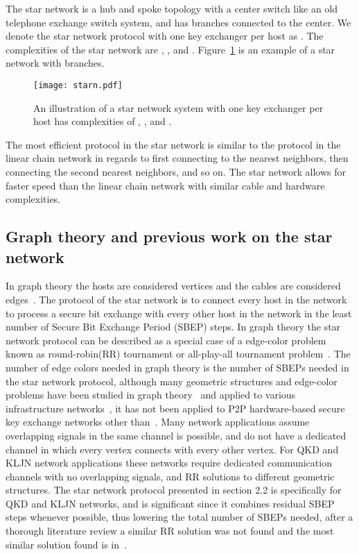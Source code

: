 \documentclass[a4paper,12pt,pdftex]{article}
\begin{document}
The star network is a hub and spoke topology with a center switch like an old telephone exchange switch system, and has branches connected to the center. We denote the star network protocol with one key exchanger per host as . The complexities of the star network are , , and . Figure~\ref{fig:starn} is an example of a star network with  branches.

\begin{figure}[h]
    \caption{An illustration of a star network system with one key exchanger per host has complexities of , , and . }
    \label{fig:starn}
  \centering
\texttt{[image: starn.pdf]}
\end{figure}

The most efficient protocol in the star network is similar to the protocol in the linear chain network in regards to first connecting to the nearest neighbors, then connecting the second nearest neighbors, and so on. The star network allows for faster speed than the linear chain network with similar cable and hardware complexities.

\subsection{Graph theory and previous work on the star network}

In graph theory the hosts are considered vertices and the cables are considered edges~\cite{introgt}. The protocol of the star network is to connect every host in the network to process a secure bit exchange with every other host in the network in the least number of Secure Bit Exchange Period (SBEP) steps. In graph theory the star network protocol can be described as a special case of a edge-color problem~\cite{edgecolor} known as round-robin(RR) tournament or all-play-all tournament problem~\cite{rrp}. The number  of edge colors needed in graph theory is the number of SBEPs needed in the star network protocol, although many geometric structures and edge-color problems have been studied in graph theory~\cite{tutte1, tutte2, best, best2, book1, book2, book3} and applied to various infrastructure networks~\cite{apply1, apply2, apply3, book4}, it has not been applied to P2P hardware-based secure key exchange networks other than~\cite{me1}. Many network applications assume overlapping signals in the same channel is possible, and do not have a dedicated channel in which every vertex connects with every other vertex. For QKD and KLJN network applications these networks require dedicated communication channels with no overlapping signals, and RR solutions to different geometric structures. The star network protocol presented in section 2.2 is specifically for QKD and KLJN networks, and is significant since it combines residual SBEP steps whenever possible, thus lowering the total number of SBEPs needed, after a thorough literature review a similar RR solution was not found and the most similar solution found is in~\cite{best}.
\end{document}
